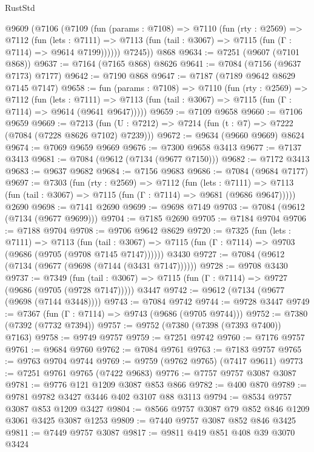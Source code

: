 \begin{lexlean}{RustStd}
\begin{coremodule}
    @9609
      (@7106
        (@7109
          (fun (params : @7108) =>
          @7110
            (fun (rty : @2569) =>
            @7112
              (fun (lets : @7111) =>
              @7113 (fun (tail : @3067) => @7115 (fun (Γ : @7114) => @9614 @7199))))))
        @7245))
    @868
@9634 := @7251 (@9607 (@7101 @868))
@9637 := @7164 (@7165 @868) @8626
@9641 := @7084 (@7156 (@9637 @7173) @7177)
@9642 := @7190 @868
@9647 := @7187 (@7189 @9642 @8629 @7145 @7147)
@9658 := fun (params : @7108) =>
  @7110
    (fun (rty : @2569) =>
    @7112
      (fun (lets : @7111) =>
      @7113 (fun (tail : @3067) => @7115 (fun (Γ : @7114) => @9614 (@9641 @9647)))))
@9659 := @7109 @9658
@9660 := @7106 @9659
@9669 := @7213 (fun (U : @7212) => @7214 (fun (t : @7) => @7222 (@7084 (@7228 @8626 @7102) @7239)))
@9672 := @9634 (@9660 @9669) @8624
@9674 := @7069 @9659 @9669
@9676 := @7300 @9658 @3413
@9677 := @7137 @3413
@9681 := @7084 (@9612 (@7134 (@9677 @7150)))
@9682 := @7172 @3413
@9683 := @9637 @9682
@9684 := @7156 @9683
@9686 := @7084 (@9684 @7177)
@9697 := @7303
    (fun (rty : @2569) =>
    @7112
      (fun (lets : @7111) =>
      @7113 (fun (tail : @3067) => @7115 (fun (Γ : @7114) => @9681 (@9686 @9647)))))
    @2690
@9698 := @7141 @2690
@9699 := @9698 @7149
@9703 := @7084 (@9612 (@7134 (@9677 @9699)))
@9704 := @7185 @2690
@9705 := @7184 @9704
@9706 := @7188 @9704
@9708 := @9706 @9642 @8629
@9720 := @7325
    (fun (lets : @7111) =>
    @7113
      (fun (tail : @3067) => @7115 (fun (Γ : @7114) => @9703 (@9686 (@9705 (@9708 @7145 @7147))))))
    @3430
@9727 := @7084 (@9612 (@7134 (@9677 (@9698 (@7144 (@3431 @7147))))))
@9728 := @9708 @3430
@9737 := @7349
    (fun (tail : @3067) => @7115 (fun (Γ : @7114) => @9727 (@9686 (@9705 (@9728 @7147)))))
    @3447
@9742 := @9612 (@7134 (@9677 (@9698 (@7144 @3448))))
@9743 := @7084 @9742
@9744 := @9728 @3447
@9749 := @7367 (fun (Γ : @7114) => @9743 (@9686 (@9705 @9744)))
@9752 := @7380 (@7392 (@7732 @7394))
@9757 := @9752 (@7380 (@7398 (@7393 @7400)) @7163)
@9758 := @9749 @9757
@9759 := @7251 @9742
@9760 := @7176 @9757
@9761 := @9684 @9760
@9762 := @7084 @9761
@9763 := @7183 @9757
@9765 := @9763 @9704 @9744
@9769 := @9759 (@9762 @9765) (@7417 @9611)
@9773 := @7251 @9761 @9765 (@7422 @9683)
@9776 := @7757 @9757 @3087 @3087
@9781 := @9776 @121 @1209 @3087 @853 @866
@9782 := @400 @870
@9789 := @9781 @9782 @3427 @3446 @402 @3107 @88 @3113
@9794 := @8534 @9757 @3087 @853 @1209 @3427
@9804 := @8566 @9757 @3087 @79 @852 @846 @1209 @3061 @3425 @3087 @1253
@9809 := @7440 @9757 @3087 @852 @846 @3425
@9811 := @7449 @9757 @3087
@9817 := @9811 @419 @851 @408 @39 @3070 @3424

\end{coremodule}
\end{lexlean}
